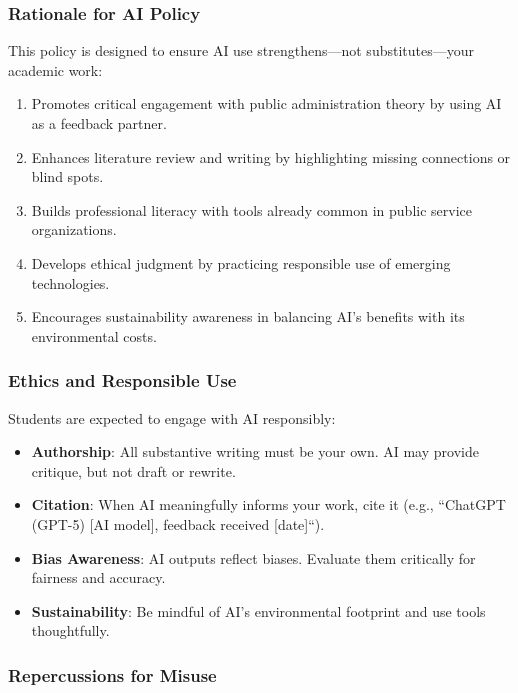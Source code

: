 \documentclass[12pt, letterpaper]{article}
\begin{document}
\subsubsection*{Rationale for AI Policy}

This policy is designed to ensure AI use strengthens—not substitutes—your academic work:

\begin{enumerate}
    \item Promotes critical engagement with public administration theory by using AI as a feedback partner.
    \item Enhances literature review and writing by highlighting missing connections or blind spots.
    \item Builds professional literacy with tools already common in public service organizations.
    \item Develops ethical judgment by practicing responsible use of emerging technologies.
    \item Encourages sustainability awareness in balancing AI's benefits with its environmental costs.
\end{enumerate}

\subsubsection*{Ethics and Responsible Use}

\noindent Students are expected to engage with AI responsibly:

\begin{itemize}
    \item \textbf{Authorship}: All substantive writing must be your own. AI may provide critique, but not draft or rewrite.
    \item \textbf{Citation}: When AI meaningfully informs your work, cite it (e.g., ``ChatGPT (GPT-5) [AI model], feedback received [date]``).
    \item \textbf{Bias Awareness}: AI outputs reflect biases. Evaluate them critically for fairness and accuracy.
    \item \textbf{Sustainability}: Be mindful of AI's environmental footprint and use tools thoughtfully.
\end{itemize}

\subsubsection*{Repercussions for Misuse}
\end{document}
